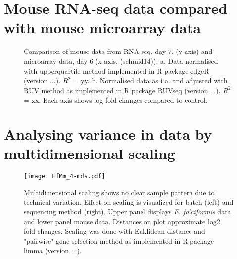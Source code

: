 \documentclass{article}
\begin{document}
\section{Mouse RNA-seq data compared with mouse microarray data}
\begin{figure}[H]
\begin{center}
\caption{Comparison of mouse data from RNA-seq, day 7, (y-axis) and microarray data, day 6 (x-axis, (schmid14)). 
	a. Data normalised with upperquartile method implemented in R package edgeR (version ...). $R^2$ = yy. 
	b. Normalised data as i a. and adjusted with RUV method as implemented in R package RUVseq (version....). 
	$R^2$ = xx. Each axis shows log fold changes compared to control.}
\end{center}
\end{figure}

\section{Analysing variance in data by multidimensional scaling}
\begin{figure}[H]
\begin{center}
	\texttt{[image: EfMm\_4-mds.pdf]} %
	\caption{Multidimensional scaling shows no clear sample pattern due to technical variation. Effect on scaling is visualized 
	for batch (left) and sequencing method (right). Upper panel displays \textit{E. falciformis} data and lower panel mouse data. 
	Distances on plot approximate log2 fold changes. Scaling was done with Euklidean distance and "pairwise" gene selection 
	method as implemented in R package limma (version ...).}
\end{center}
\end{figure}

\clearpage
\end{document}
